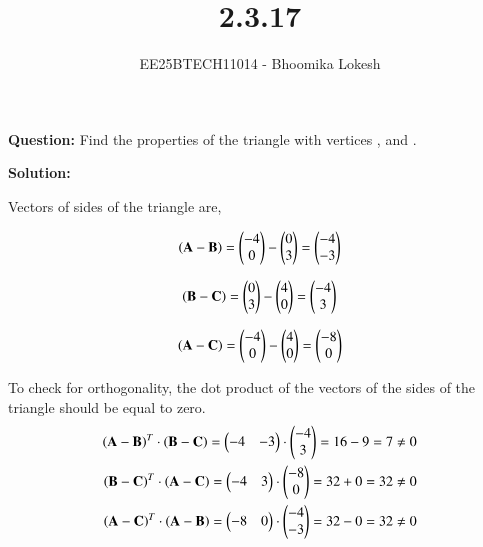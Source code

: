 \documentclass[journal]{IEEEtran}
\begin{document}

\vspace{3cm}

\title{2.3.17}
\author{EE25BTECH11014 - Bhoomika Lokesh}
{\let\newpage\relax\maketitle}

\renewcommand{\thefigure}{\theenumi}
\renewcommand{\thetable}{\theenumi}
\setlength{\intextsep}{10pt} %


\renewcommand{\thetable}{\theenumi}

\textbf{Question:} Find the properties of the triangle with vertices , and . 

\textbf{Solution:}
\begin{table}[H]    
  \centering
  
  \caption{Variables Used}
  \label{tab:2.3.17}
\end{table}

Vectors of sides of the triangle are,

\begin{align}
    \left(\mathbf{A}-\mathbf{B}\right)=\begin{pmatrix}-4\\0\end{pmatrix}-\begin{pmatrix}0\\3\end{pmatrix}=\begin{pmatrix}-4\\-3\end{pmatrix}
\end{align}

 \begin{align}
\left( \mathbf{B}-\mathbf{C}\right)=\begin{pmatrix}0\\3\end{pmatrix}-\begin{pmatrix}4\\0\end{pmatrix}=\begin{pmatrix}-4\\3\end{pmatrix}
 \end{align}

 \begin{align}
 \left(\mathbf{A}-\mathbf{C}\right)=\begin{pmatrix}-4\\0\end{pmatrix}-\begin{pmatrix}4\\0\end{pmatrix}=\begin{pmatrix}-8\\0\end{pmatrix}
 \end{align}

To check for orthogonality, the dot product of the vectors of the sides of the triangle should be equal to zero.
\begin{align}
     \left(\mathbf{A}-\mathbf{B}\right)^T \cdot \left( \mathbf{B}-\mathbf{C}\right)=\begin{pmatrix}-4&-3\end{pmatrix}\cdot \begin{pmatrix}-4\\3\end{pmatrix}=16-9=7\neq 0\\
     \left( \mathbf{B}-\mathbf{C}\right)^T \cdot  \left(\mathbf{A}-\mathbf{C}\right)= \begin{pmatrix}-4&3\end{pmatrix} \cdot \begin{pmatrix}-8\\0\end{pmatrix}=32+0=32 \neq 0\\
      \left(\mathbf{A}-\mathbf{C}\right)^T \cdot \left(\mathbf{A}-\mathbf{B}\right)=\begin{pmatrix}-8&0\end{pmatrix} \cdot \begin{pmatrix}-4\\-3\end{pmatrix}=32-0=32 \neq 0
     \end{align}
\end{document}
